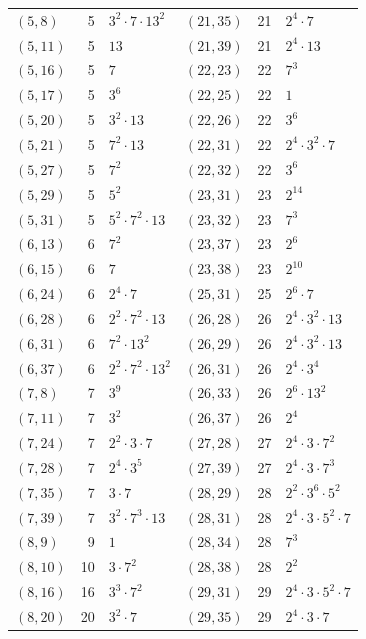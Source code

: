 \documentclass[11pt]{article}
\begin{document}
\begin{longtable}{@{}lrl@{\qquad}lrl@{}}
$(5,8)$ & 5 & $3^{2}\cdot 7\cdot 13^{2}$ & $(21,35)$ & 21 & $2^{4}\cdot 7$\\
$(5,11)$ & 5 & $13$ & $(21,39)$ & 21 & $2^{4}\cdot 13$\\
$(5,16)$ & 5 & $7$ & $(22,23)$ & 22 & $7^{3}$\\
$(5,17)$ & 5 & $3^{6}$ & $(22,25)$ & 22 & $1$\\
$(5,20)$ & 5 & $3^{2}\cdot 13$ & $(22,26)$ & 22 & $3^{6}$\\
$(5,21)$ & 5 & $7^{2}\cdot 13$ & $(22,31)$ & 22 & $2^{4}\cdot 3^{2}\cdot 7$\\
$(5,27)$ & 5 & $7^{2}$ & $(22,32)$ & 22 & $3^{6}$\\
$(5,29)$ & 5 & $5^{2}$ & $(23,31)$ & 23 & $2^{14}$\\
$(5,31)$ & 5 & $5^{2}\cdot 7^{2}\cdot 13$ & $(23,32)$ & 23 & $7^{3}$\\
$(6,13)$ & 6 & $7^{2}$ & $(23,37)$ & 23 & $2^{6}$\\
$(6,15)$ & 6 & $7$ & $(23,38)$ & 23 & $2^{10}$\\
$(6,24)$ & 6 & $2^{4}\cdot 7$ & $(25,31)$ & 25 & $2^{6}\cdot 7$\\
$(6,28)$ & 6 & $2^{2}\cdot 7^{2}\cdot 13$ & $(26,28)$ & 26 & $2^{4}\cdot 3^{2}\cdot 13$\\
$(6,31)$ & 6 & $7^{2}\cdot 13^{2}$ & $(26,29)$ & 26 & $2^{4}\cdot 3^{2}\cdot 13$\\
$(6,37)$ & 6 & $2^{2}\cdot 7^{2}\cdot 13^{2}$ & $(26,31)$ & 26 & $2^{4}\cdot 3^{4}$\\
$(7,8)$ & 7 & $3^{9}$ & $(26,33)$ & 26 & $2^{6}\cdot 13^{2}$\\
$(7,11)$ & 7 & $3^{2}$ & $(26,37)$ & 26 & $2^{4}$\\
$(7,24)$ & 7 & $2^{2}\cdot 3\cdot 7$ & $(27,28)$ & 27 & $2^{4}\cdot 3\cdot 7^{2}$\\
$(7,28)$ & 7 & $2^{4}\cdot 3^{5}$ & $(27,39)$ & 27 & $2^{4}\cdot 3\cdot 7^{3}$\\
$(7,35)$ & 7 & $3\cdot 7$ & $(28,29)$ & 28 & $2^{2}\cdot 3^{6}\cdot 5^{2}$\\
$(7,39)$ & 7 & $3^{2}\cdot 7^{3}\cdot 13$ & $(28,31)$ & 28 & $2^{4}\cdot 3\cdot 5^{2}\cdot 7$\\
$(8,9)$ & 9 & $1$ & $(28,34)$ & 28 & $7^{3}$\\
$(8,10)$ & 10 & $3\cdot 7^{2}$ & $(28,38)$ & 28 & $2^{2}$\\
$(8,16)$ & 16 & $3^{3}\cdot 7^{2}$ & $(29,31)$ & 29 & $2^{4}\cdot 3\cdot 5^{2}\cdot 7$\\
$(8,20)$ & 20 & $3^{2}\cdot 7$ & $(29,35)$ & 29 & $2^{4}\cdot 3\cdot 7$\\

\end{longtable}
\end{document}
